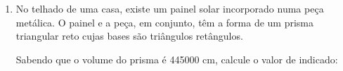 \documentclass[twocolumn,oneside,a4paper,12pt]{article}
\begin{document}
\begin{enumerate}
\item  No telhado de uma casa, existe um painel solar incorporado numa peça metálica. O painel e a peça, em conjunto, têm a forma de um prisma triangular reto cujas bases são triângulos retângulos.

Sabendo que o volume do prisma é 445000 cm, calcule o valor de  indicado:
\end{enumerate}
\end{document}
